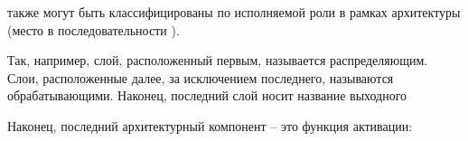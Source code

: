  также могут быть классифицированы по исполняемой роли в рамках архитектуры (место в последовательности ).

Так, например, слой, расположенный первым, называется распределяющим. Слои, расположенные далее, за исключением последнего, называются обрабатывающими. Наконец, последний слой носит название выходного 

Наконец, последний архитектурный компонент  -- это функция активации:

\begin{SCn}
		
\end{SCn}

